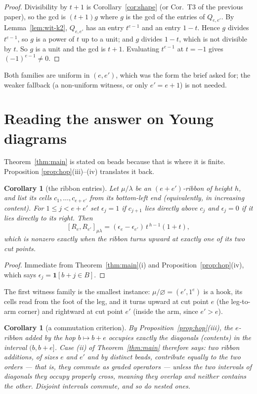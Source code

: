 \documentclass[11pt]{article}
\newtheorem{corollary}[theorem]{Corollary}
\theoremstyle{definition}
\newcommand{\one}{\mathbf{1}}
\begin{document}
\begin{proof}
Divisibility by $t+1$ is Corollary~\ref{cor:shape} (or Cor.~T3 of the previous paper), so the gcd
is $(t+1)g$ where $g$ is the gcd of the entries of $Q_{e,e'}$. By Lemma~\ref{lem:wit-k2},
$Q_{e,e'}$ has an entry $t^{e-1}$ and an entry $1-t$. Hence $g$ divides $t^{e-1}$, so $g$ is a
power of $t$ up to a unit; and $g$ divides $1-t$, which is not divisible by $t$. So $g$ is a unit
and the gcd is $t+1$. Evaluating $t^{e-1}$ at $t=-1$ gives $(-1)^{e-1}\ne0$.
\end{proof}

Both families are uniform in $(e,e')$, which was the form the brief asked for; the weaker
fallback (a non-uniform witness, or only $e'=e+1$) is not needed.

\section{Reading the answer on Young diagrams}

Theorem~\ref{thm:main} is stated on beads because that is where it is finite. Proposition
\ref{prop:hop}(iii)--(iv) translates it back.

\begin{corollary}[the ribbon entries]\label{cor:ribbon}
Let $\mu/\lambda$ be an $(e+e')$-ribbon of height $h$, and list its cells $c_1,\dots,c_{e+e'}$
from its bottom-left end (equivalently, in increasing content). For $1\le j<e+e'$ set
$\epsilon_j=1$ if $c_{j+1}$ lies directly above $c_j$ and $\epsilon_j=0$ if it lies directly to
its right. Then
\[
[R_e,R_{e'}]_{\mu\lambda}=(\epsilon_e-\epsilon_{e'})\,t^{\,h-1}(1+t),
\]
which is nonzero exactly when the ribbon turns upward at exactly one of its two cut points.
\end{corollary}

\begin{proof}
Immediate from Theorem~\ref{thm:main}(i) and Proposition~\ref{prop:hop}(iv), which says
$\epsilon_j=\one[b+j\in B]$.
\end{proof}

The first witness family is the smallest instance: $\mu/\varnothing=(e',1^e)$ is a hook, its
cells read from the foot of the leg, and it turns upward at cut point $e$ (the leg-to-arm corner)
and rightward at cut point $e'$ (inside the arm, since $e'>e$).

\begin{corollary}[a commutation criterion]\label{cor:diag}
By Proposition~\ref{prop:hop}(iii), the $e$-ribbon added by the hop $b\mapsto b+e$ occupies
exactly the diagonals (contents) in the interval $(b,b+e]$. Case (ii) of Theorem~\ref{thm:main}
therefore says: two ribbon additions, of sizes $e$ and $e'$ and by distinct beads, contribute
equally to the two orders --- that is, they commute \emph{as graded operators} --- unless the two
intervals of diagonals they occupy \emph{properly cross}, meaning they overlap and neither
contains the other. Disjoint intervals commute, and so do nested ones.
\end{corollary}
\end{document}
